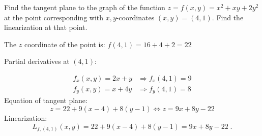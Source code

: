 \begin{frame}
\begin{example}
Find the tangent plane to the graph of the function $z=f(x,y)=x^2+xy+2y^2$ at the point corresponding with $x,y$-coordinates $(x,y) = (4,1)$. Find the linearization at that point.

\pause The $z$ coordinate of the point is:
$f(4,1) = 16+4+2 = 22$

\pause Partial derivatives \alert<1->{at $(4,1)$}:

\begin{align*}
  f_x(x,y) = 2x+y & \Longrightarrow f_x(4,1) = 9 \\
  f_y(x,y) = x+4y & \Longrightarrow f_y(4,1) = 8
\end{align*}
%
\pause Equation of tangent plane:
%
$$z = 22+ 9(x-4) + 8 (y-1) \Longleftrightarrow z = 9x+8y -22$$
%
\pause Linearization:
%
$$L_{f, (4,1)}(x,y) = 22+ 9(x-4) + 8 (y-1) = 9x+8y -22\; .$$
%
\end{example}
\end{frame}
